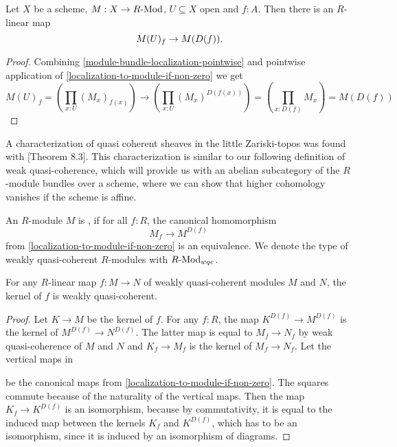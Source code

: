 \begin{lemma}%
  \label{localization-to-restriction}                    
  Let $X$ be a scheme, $M:X\to R\text{-}\mathrm{Mod}$, $U\subseteq X$ open and $f:A$.
  Then there is an $R$-linear map
  \[
    M(U)_f \to M(D(f)) 
    \rlap{.}
  \]
\end{lemma}

\begin{proof}
  Combining \cref{module-bundle-localization-pointwise}
  and pointwise application of \cref{localization-to-module-if-non-zero} we get
  \[
    M(U)_f=\left(\prod_{x:U}(M_x)_{f(x)}\right)\to \left(\prod_{x:U}(M_x)^{D(f(x))}\right)
    =\left(\prod_{x:D(f)}M_x\right)
    =M(D(f))
  \]
\end{proof}

A characterization of quasi coherent sheaves in the little Zariski-topos was found with \cite{ingo-thesis}[Theorem 8.3].
This characterization is similar to our following definition of weak quasi-coherence,
which will provide us with an abelian subcategory of the $R$-module bundles over a scheme,
where we can show that higher cohomology vanishes if the scheme is affine.

\begin{definition}
  \label{weakly-quasi-coherent-module}
  An $R$-module $M$ is ,
  if for all $f:R$, the canonical homomorphism
  \[
    M_f\to M^{D(f)}
  \]
  from \cref{localization-to-module-if-non-zero} is an equivalence.
  We denote the type of weakly quasi-coherent $R$-modules
  with $R\text{-}\mathrm{Mod}_{wqc}$.
\end{definition}

\begin{lemma}
  \label{kernel-wqc}
  For any $R$-linear map $f:M\to N$ of weakly quasi-coherent modules $M$ and $N$,
  the kernel of $f$ is weakly quasi-coherent.
\end{lemma}

\begin{proof}
  Let $K\to M$ be the kernel of $f$.
  For any $f:R$, the map $K^{D(f)}\to M^{D(f)}$ is the kernel of $M^{D(f)}\to N^{D(f)}$.
  The latter map is equal to $M_f\to N_f$ by weak quasi-coherence of $M$ and $N$
  and $K_f\to M_f$ is the kernel of $M_f\to N_f$.
  Let the vertical maps in
  \begin{center}
  \end{center}
  be the canonical maps from \cref{localization-to-module-if-non-zero}.
  The squares commute because of the naturality of the vertical maps.
  Then the map $K_f\to K^{D(f)}$ is an isomorphism,
  because by commutativity, it is equal to the induced map between the kernels $K_f$ and $K^{D(f)}$,
  which has to be an isomorphism, since it is induced by an isomorphism of diagrams.
\end{proof}

